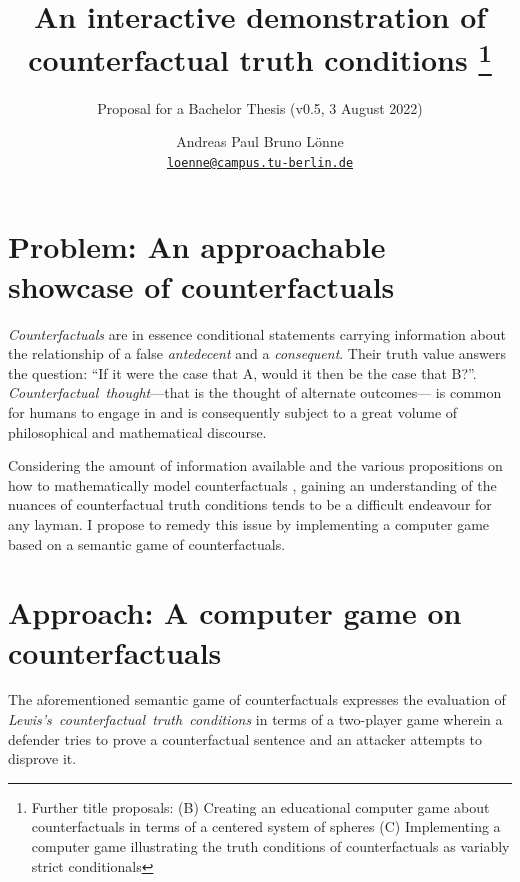 \documentclass[a4paper,american]{paper}
\providecommand*{\code}[1]{\texttt{#1}}
\begin{document}
\title{An interactive demonstration of counterfactual truth conditions%
	\footnote{Further title proposals:
		(B) Creating an educational computer game about counterfactuals in terms of a centered system of spheres
		(C) Implementing a computer game illustrating the truth conditions of counterfactuals as variably strict conditionals
	}
}

\subtitle{Proposal for a Bachelor Thesis (v0.5, 3 August 2022)}

\author{%
	Andreas Paul Bruno Lönne\\
	\code{\href{mailto:loenne@campus.tu-berlin.de}{loenne@campus.tu-berlin.de}}
}


\maketitle

\section*{Problem: An approachable showcase of counterfactuals}
{\it Counterfactuals} are in essence conditional statements carrying information about the relationship of a false {\it antedecent} and a {\it consequent}. Their truth value answers the question: ``If it were the case that A, would it then be the case that B?''. {\it Counterfactual~thought}---that is the thought of alternate outcomes---\cite{byrne_counterfactual_thought_2016} is common for humans to engage in and is consequently subject to a great volume of philosophical and mathematical discourse. 

Considering the amount of information available and the various propositions on how to mathematically model counterfactuals \cite{stalnaker_theory_1968, stalnaker_semantic_1970,  lewis_counterfactuals_1973}, gaining an understanding of the nuances of counterfactual truth conditions tends to be a difficult endeavour for any layman. I propose to remedy this issue by implementing a computer game based on a semantic game of counterfactuals.

\section*{Approach: A computer game on counterfactuals}
The aforementioned semantic game of counterfactuals expresses the evaluation of {\it Lewis's~counterfactual~truth~conditions} \cite{lewis_counterfactuals_1973} in terms of a two-player game wherein a defender tries to prove a counterfactual sentence and an attacker attempts to disprove it.
\end{document}

